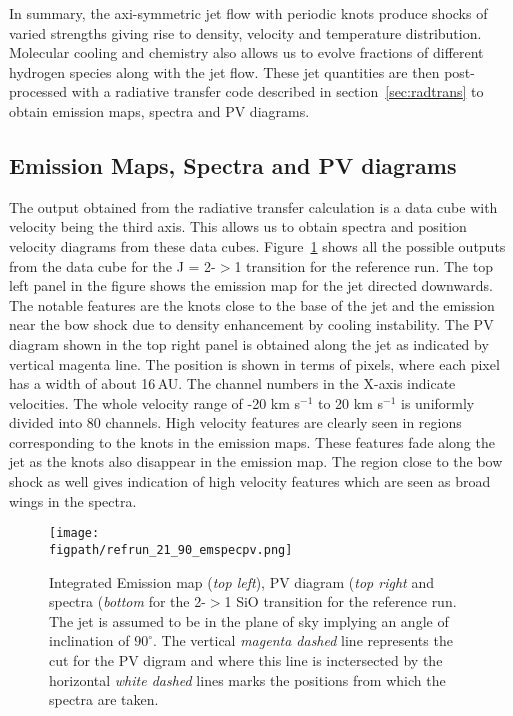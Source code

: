 \documentclass[useAMS,usenatbib,letters]{mn2e}
\newcommand{\figpath}{PFIGS/}
\begin{document}
In summary, the axi-symmetric jet flow with periodic knots 
produce shocks of varied strengths giving rise to density, velocity and
temperature distribution. Molecular cooling and chemistry also 
allows us to evolve fractions of different hydrogen species along with the jet
flow. These jet quantities are then post-processed with a radiative
transfer code described in section~\ref{sec:radtrans} to obtain emission maps,
spectra and PV diagrams.



\subsection{Emission Maps, Spectra and PV diagrams}
\label{ssec:emspecpv}
The output obtained from the radiative transfer calculation is a data
cube with velocity being the third axis. This allows us to obtain
spectra and position velocity diagrams from these data cubes. 
Figure~\ref{empvspec90} shows all the possible outputs from the data
cube for the J = 2-$>$1 transition for the reference run. 
The top left panel in the figure shows the emission map for the jet
directed downwards. The notable features are the knots close to the
base of the jet and the emission near the bow shock due to density
enhancement by cooling instability. The PV diagram shown in the top
right panel is obtained along the jet as indicated by vertical magenta
line. The position is shown in terms of pixels, where each pixel has a
width of about 16\,AU. The channel numbers in the X-axis indicate
velocities. The whole velocity range of -20 km s$^{-1}$ to 20 km
s$^{-1}$ is uniformly divided into 80 channels. High velocity features
are clearly seen in regions corresponding to the knots in the emission
maps. These features fade along the jet as the knots also disappear in
the emission map. The region close to the bow shock as well gives
indication of high velocity features which are seen as broad wings in
the spectra. 
%

\begin{figure}
 \texttt{[image: \\figpath/refrun\_21\_90\_emspecpv.png]}
 \caption{Integrated Emission map ({\it top left}), PV diagram ({\it top right}
   and spectra ({\it bottom} for the
   2-$>$1 SiO transition for the reference run. 
   The jet is assumed to be in the plane of sky implying an angle of
   inclination of $90^{\circ}$. The vertical {\it magenta dashed} line represents the cut for the PV digram and where this line is inctersected by the horizontal
 {\it white dashed} lines marks the positions from which the spectra are taken.} 
\label{empvspec90}
\end{figure}
\end{document}
